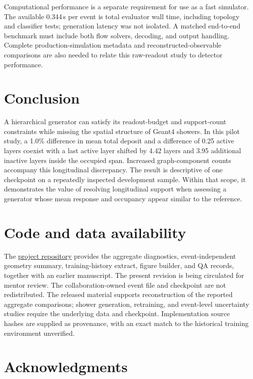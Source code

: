 \documentclass[11pt]{article}
\begin{document}
Computational performance is a separate requirement for use as a fast simulator. The available 0.344\,s per event is total evaluator wall time, including topology and classifier tests; generation latency was not isolated. A matched end-to-end benchmark must include both flow solvers, decoding, and output handling. Complete production-simulation metadata and reconstructed-observable comparisons are also needed to relate this raw-readout study to detector performance.

\section{Conclusion}

A hierarchical generator can satisfy its readout-budget and support-count constraints while missing the spatial structure of Geant4 showers. In this pilot study, a 1.0\% difference in mean total deposit and a difference of 0.25 active layers coexist with a last active layer shifted by 4.42 layers and 3.95 additional inactive layers inside the occupied span. Increased graph-component counts accompany this longitudinal discrepancy. The result is descriptive of one checkpoint on a repeatedly inspected development sample. Within that scope, it demonstrates the value of resolving longitudinal support when assessing a generator whose mean response and occupancy appear similar to the reference.

\section*{Code and data availability}

The \href{https://github.com/JulianAttemptsCoding/fast-mc-paper}{project repository} provides the aggregate diagnostics, event-independent geometry summary, training-history extract, figure builder, and QA records, together with an earlier manuscript. The present revision is being circulated for mentor review. The collaboration-owned event file and checkpoint are not redistributed. The released material supports reconstruction of the reported aggregate comparisons; shower generation, retraining, and event-level uncertainty studies require the underlying data and checkpoint. Implementation source hashes are supplied as provenance, with an exact match to the historical training environment unverified.

\section*{Acknowledgments}
\end{document}
